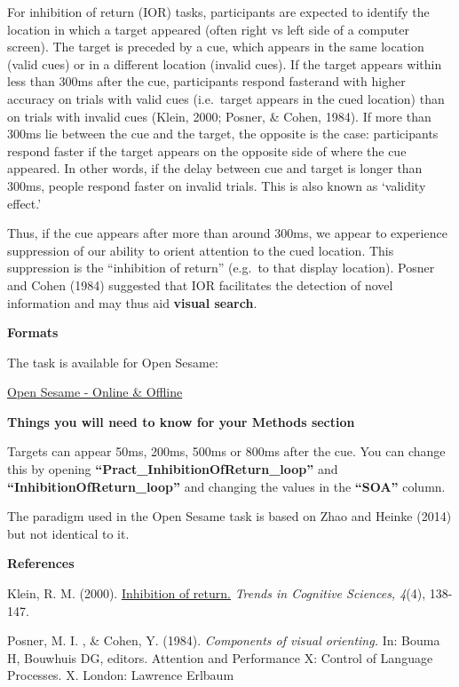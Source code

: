 \documentclass[
]{book}
\begin{document}
For inhibition of return (IOR) tasks, participants are expected to identify the location in which a target appeared (often right vs left side of a computer screen). The target is preceded by a cue, which appears in the same location (valid cues) or in a different location (invalid cues). If the target appears within less than 300ms after the cue, participants respond fasterand with higher accuracy on trials with valid cues (i.e.~target appears in the cued location) than on trials with invalid cues (Klein, 2000; Posner, \& Cohen, 1984). If more than 300ms lie between the cue and the target, the opposite is the case: participants respond faster if the target appears on the opposite side of where the cue appeared. In other words, if the delay between cue and target is longer than 300ms, people respond faster on invalid trials. This is also known as `validity effect.'

Thus, if the cue appears after more than around 300ms, we appear to experience suppression of our ability to orient attention to the cued location. This suppression is the ``inhibition of return'' (e.g.~to that display location). Posner and Cohen (1984) suggested that IOR facilitates the detection of novel information and may thus aid \textbf{visual search}.

\textbf{Formats}

The task is available for Open Sesame:

\href{GitHub/InhibitionofReturn.osexp}{Open Sesame - Online \& Offline}

\textbf{Things you will need to know for your Methods section}

Targets can appear 50ms, 200ms, 500ms or 800ms after the cue. You can change this by opening \textbf{``Pract\_InhibitionOfReturn\_loop''} and \textbf{``InhibitionOfReturn\_loop''} and changing the values in the \textbf{``SOA''} column.

The paradigm used in the Open Sesame task is based on Zhao and Heinke (2014) but not identical to it.

\textbf{References}

Klein, R. M. (2000). \href{https://www.researchgate.net/profile/Juan_Lupianez/publication/233995999_Inhibition_of_Return/links/0c960525d778745c66000000/Inhibition-of-Return.pdf}{Inhibition of return.} \emph{Trends in Cognitive Sciences, 4}(4), 138-147.

Posner, M. I. , \& Cohen, Y. (1984). \emph{Components of visual orienting.} In: Bouma H, Bouwhuis DG, editors. Attention and Performance X: Control of Language Processes. X. London: Lawrence Erlbaum
\end{document}
